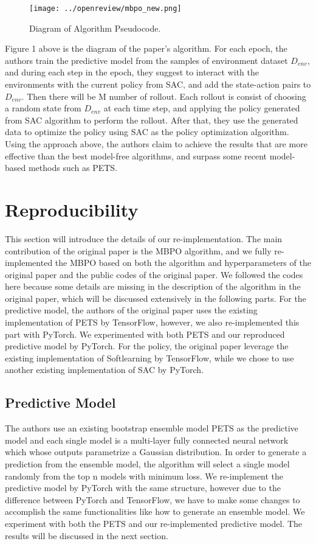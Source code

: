 \begin{figure}[h]
  \centering
  \texttt{[image: ../openreview/mbpo\_new.png]}
  \caption{Diagram of Algorithm Pseudocode.}
\end{figure}

Figure 1 above is the diagram of the paper's algorithm. For each epoch, the authors train the predictive model from the samples of environment dataset $D_{env}$, and during each step in the epoch, they suggest to interact with the environments with the current policy from SAC, and add the state-action pairs to $D_{env}$. Then there will be M number of rollout. Each rollout is consist of choosing a random state from $D_{env}$ at each time step, and applying the policy generated from SAC algorithm to perform the rollout. After that, they use the generated data to optimize the policy using SAC as the policy optimization algorithm. Using the approach above, the authors claim to achieve the results that are more effective than the best model-free algorithms, and surpass some recent model-based methods such as PETS.

\section{Reproducibility}
This section will introduce the details of our re-implementation. The main contribution of the original paper is the MBPO algorithm, and we fully re-implemented the MBPO based on both the algorithm and hyperparameters of the original paper and the public codes of the original paper. We followed the codes here because some details are missing in the description of the algorithm in the original paper, which will be discussed extensively in the following parts. For the predictive model, the authors of the original paper uses the existing implementation of PETS by TensorFlow, however, we also re-implemented this part with PyTorch. We experimented with both PETS and our reproduced predictive model by PyTorch. For the policy, the original paper leverage the existing implementation of Softlearning by TensorFlow, while we chose to use another existing implementation of SAC by PyTorch.

\subsection{Predictive Model}
The authors use an existing bootstrap ensemble model PETS as the predictive model and each single model is a multi-layer fully connected neural network which whose outputs parametrize a Gaussian distribution. In order to generate a prediction from the ensemble model, the algorithm will select a single model randomly from the top n models with minimum loss. We re-implement the predictive model by PyTorch with the same structure, however due to the difference between PyTorch and TensorFlow, we have to make some changes to accomplish the same functionalities like how to generate an ensemble model. We experiment with both the PETS and our re-implemented predictive model. The results will be discussed in the next section.

